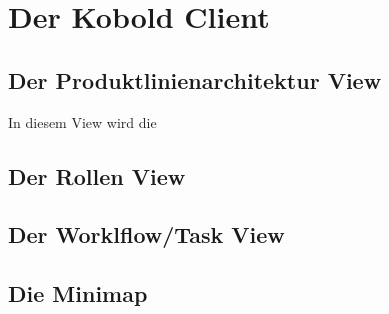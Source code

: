 \chapter{Der Kobold Client}
\section{Der Produktlinienarchitektur View}
In diesem View wird die 
\section{Der Rollen View}
\section{Der Worklflow/Task View}
\section{Die Minimap}